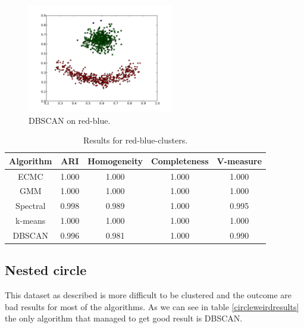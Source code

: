 \documentclass[conference]{IEEEtran}
\begin{document}
\begin{figure}[th]
\centering
\includegraphics[width=15pc]{dbscan_red-blue-clusters.pdf}
\caption{DBSCAN on red-blue.}
\label{DBSCAN_redblue}
\end{figure}

\begin{table}[htbp]
\caption{Results for red-blue-clusters.}
\label{redblueresults}
\begin{center}
\setlength{\tabcolsep}{3pt}
\begin{tabular}{ |c|c|c|c|c| }
\hline
	\bf Algorithm & \bf ARI & \bf Homogeneity & \bf Completeness & \bf V-measure\\ \hline
	
	ECMC & 1.000 & 1.000 & 1.000 & 1.000 \\ \hline
	GMM & 1.000 & 1.000 & 1.000 & 1.000 \\ \hline
	Spectral & 0.998 & 0.989 & 1.000 & 0.995 \\ \hline
	k-means & 1.000 & 1.000 & 1.000 & 1.000 \\ \hline
	DBSCAN & 0.996 & 0.981 & 1.000 & 0.990 \\ \hline
\end{tabular}
\end{center}
\end{table}

\subsection{Nested circle}
This dataset as described is more difficult to be clustered and the outcome are bad results for most of
the algorithms. As we can see in table \ref{circleweirdresults} the only algorithm that managed
to get good result is DBSCAN.
\end{document}
